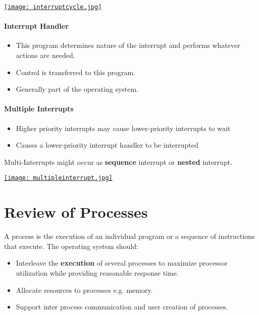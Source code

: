 \documentclass[10pt,a4paper,openany]{book}
\begin{document}
    \href{http://cnx.org/resources/5fcfce2d72b6cc577496bbca9730397b3227d743/graphics7.jpg}{\texttt{[image: interruptcycle.jpg]}}

    \subsubsection*{Interrupt Handler}
    \begin{itemize}
    \item This program determines nature of the interrupt and performs whatever actions are needed.
    \item Control is transferred to this program.
    \item Generally part of the operating system.
    \end{itemize}

    \subsubsection*{Multiple Interrupts}
    \begin{itemize}
    \item Higher priority interrupts may cause lower-priority interrupts to wait
    \item Causes a lower-priority interrupt handler to be interrupted
    \end{itemize}

    Multi-Interrupts might occur as \textbf{sequence} interrupt or \textbf{nested} interrupt.

    \href{http://cnx.org/resources/32a82e21d46f5b23027905acb42bdd19dc38a5b3/graphics10.jpg}{\texttt{[image: multipleinterrupt.jpg]}}

    \chapter{Review of Processes}
    A process is the execution of an individual program or a sequence of instructions that execute. The operating system should:
    \begin{itemize}
    \item Interleave the \textbf{execution} of several processes to maximize processor utilization while providing reasonable response time.
    \item Allocate resources to processes e.g. memory.
    \item Support inter process communication and user creation of processes.
    \end{itemize}
\end{document}
